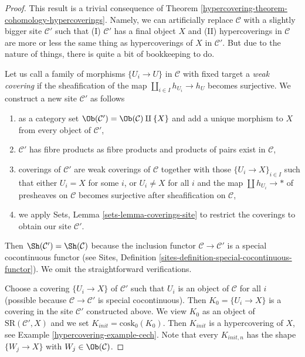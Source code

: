 \begin{proof}

This result is a trivial consequence of
Theorem \ref{hypercovering-theorem-cohomology-hypercoverings}.
Namely, we can artificially replace $\mathcal{C}$ with a slightly
bigger site $\mathcal{C}'$ such that
(I) $\mathcal{C}'$ has a final object $X$ and (II)
hypercoverings in $\mathcal{C}$ are more or less the
same thing as hypercoverings of $X$ in $\mathcal{C}'$.
But due to the nature of things, there is quite a bit of
bookkeeping to do.

\medskip\noindent
Let us call a family of morphisms $\{U_i \to U\}$ in $\mathcal{C}$
with fixed target a {\it weak covering} if the sheafification of the
map $\coprod_{i \in I} h_{U_i} \to h_U$ becomes surjective.
We construct a new site $\mathcal{C}'$ as follows
\begin{enumerate}
\item as a category set $\Ob(\mathcal{C}') = \Ob(\mathcal{C}) \amalg \{X\}$
and add a unique morphism to $X$ from every object of $\mathcal{C}'$,
\item $\mathcal{C}'$ has fibre products as fibre products and products
of pairs exist in $\mathcal{C}$,
\item coverings of $\mathcal{C}'$ are weak coverings of $\mathcal{C}$
together with those $\{U_i \to X\}_{i \in I}$ such that either $U_i = X$
for some $i$, or $U_i \not = X$ for all $i$ and the map
$\coprod h_{U_i} \to *$ of presheaves on $\mathcal{C}$ becomes
surjective after sheafification on $\mathcal{C}$,
\item we apply Sets, Lemma \ref{sets-lemma-coverings-site}
to restrict the coverings to obtain our site $\mathcal{C}'$.
\end{enumerate}
Then $\Sh(\mathcal{C}') = \Sh(\mathcal{C})$ because the inclusion
functor $\mathcal{C} \to \mathcal{C}'$ is a special cocontinuous functor
(see Sites, Definition \ref{sites-definition-special-cocontinuous-functor}).
We omit the straightforward verifications.

\medskip\noindent
Choose a covering $\{U_i \to X\}$ of $\mathcal{C}'$ such that $U_i$ is an
object of $\mathcal{C}$ for all $i$ (possible because
$\mathcal{C} \to \mathcal{C}'$ is special cocontinuous).
Then $K_0 = \{U_i \to X\}$ is a covering in the
site $\mathcal{C}'$ constructed above. We view $K_0$ as an object of
$\text{SR}(\mathcal{C}', X)$ and we set $K_{init} = \text{cosk}_0(K_0)$.
Then $K_{init}$ is a hypercovering of $X$, see
Example \ref{hypercovering-example-cech}. Note that every $K_{init, n}$ has the shape
$\{W_j \to X\}$ with $W_j \in \Ob(\mathcal{C})$.


\end{proof}
